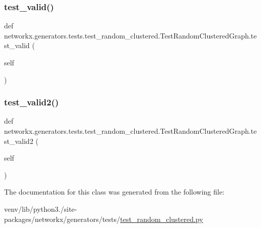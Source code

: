 \subsubsection{\texorpdfstring{test\+\_\+valid()}{test\_valid()}}
{\footnotesize\ttfamily def networkx.\+generators.\+tests.\+test\+\_\+random\+\_\+clustered.\+Test\+Random\+Clustered\+Graph.\+test\+\_\+valid (\begin{DoxyParamCaption}\item[{}]{self }\end{DoxyParamCaption})}

\mbox{\label{classnetworkx_1_1generators_1_1tests_1_1test__random__clustered_1_1TestRandomClusteredGraph_ae1b3098280316efad9a1f78ce54247d4}} 
\subsubsection{\texorpdfstring{test\+\_\+valid2()}{test\_valid2()}}
{\footnotesize\ttfamily def networkx.\+generators.\+tests.\+test\+\_\+random\+\_\+clustered.\+Test\+Random\+Clustered\+Graph.\+test\+\_\+valid2 (\begin{DoxyParamCaption}\item[{}]{self }\end{DoxyParamCaption})}



The documentation for this class was generated from the following file\+:\begin{DoxyCompactItemize}
\item 
venv/lib/python3./site-\/packages/networkx/generators/tests/\hyperlink{test__random__clustered_8py}{test\+\_\+random\+\_\+clustered.\+py}\end{DoxyCompactItemize}
